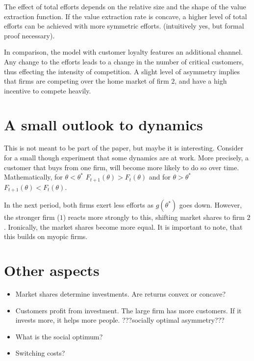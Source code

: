 \documentclass[a4paper, 11pt]{article}
\begin{document}
The effect of total efforts depends on the relative size and the shape of the value extraction function. If the value extraction rate is concave, a higher level of total efforts can be achieved with more symmetric efforts. (intuitively yes, but formal proof necessary).

In comparison, the model with customer loyalty features an additional channel. Any change to the efforts leads to a change in the number of critical customers, thus effecting the intensity of competition. A slight level of asymmetry implies that firms are competing over the home market of firm $2$, and have a high incentive to compete heavily. 

\section{A small outlook to dynamics}
This is not meant to be part of the paper, but maybe it is interesting. Consider for a small though experiment that some dynamics are at work. More precisely, a customer that buys from one firm, will become more likely to do so over time. Mathematically, for $\theta<\theta^*$ $F_{t+1}(\theta)>F_t(\theta)$ and for $\theta>\theta^*$ $F_{t+1}(\theta)<F_t(\theta)$.

In the next period, both firms exert less efforts as $g(\theta^*)$ goes down. However, the stronger firm ($1$) reacts more strongly to this, shifting market shares to firm $2$. Ironically, the market shares become more equal. It is important to note, that this builds on myopic firms.  
\section{Other aspects}
\begin{itemize}
	\item Market shares determine investments. Are returns convex or concave?
	\item Customers profit from investment. The large firm has more customers. If it invests more, it helps more people. ???socially optimal asymmetry???
	\item What is the social optimum?
	\item Switching costs?
\end{itemize}

 
\end{document}
